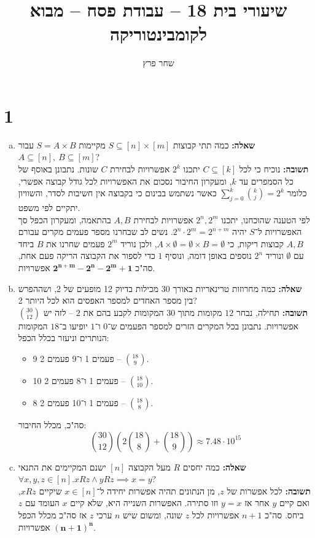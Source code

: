 \documentclass[]{article}
\title{שיעורי בית 18 -- עבודת פסח -- מבוא לקומבינטוריקה}
\author{שחר פרץ}
\begin{document}
	\maketitle
	\section*{1} %
	\begin{enumerate}[(a)]
		\item \textbf{שאלה: } כמה תתי קבוצות $S \subseteq [n] \times [m]$ מקיימות $S = A \times B$ עבור $A \subseteq [n], \ B \subseteq [m]$? \\
		\textbf{תשובה: }נוכיח כי לכל $C \subseteq [k]$ יתכנו $2^k$ אפשרויות לבחירת $C$ שונות. נתבונן באוסף של כל הסמפרים עד $k$, ומעקרון החיבור נסכום את האפשרויות לכל גודל קבוצה אפשרי, כלומר $\sum_{j = 0}^{k} \binom{k}{j} = 2^k$ כאשר נשתמש בבינום כי בקבוצה אין חשיבות לסדר, והשוויון יתקיים לפי משפט. \\
		לפי הטענה שהוכחנו, יתכנו $2^n, 2^m$ אפשרויות לבחירת $A, B$ בהתאמה, ומעקרון הכפל סך האפשרויות ל־$S$ יהיה
		$2^n \cdot 2^m = 2^{n + m}$. נשים לב שבחרנו מספר פעמים מקרים עבורם $A, B$ קבוצות ריקות, כי $A \times \emptyset = \emptyset \times B = \emptyset$, ולכן נוריד $2^m$ פעמים שחרנו את $B$ ביחד עם $\emptyset$ ונוריד $2^n$ נוספים באופן דומה, ונוסיף $1$ כדי לספור את הקבוצה הריקה פעם אחת, סה"כ $\bm{2^{n + m} - 2^n - 2^m + 1}$ אפשרויות. 
		\item \textbf{שאלה: }כמה מחרוזות טרינאריות באורך 30 מכילות בדיוק 12 מופעים של 2, ושההפרש בין מספר האחדים למספר האפסים הוא לכל היותר 2? \\
		\textbf{תשובה: }תחילה, נבחר $12$ מקומות מתוך $30$ המקומות לקבע בהם את $2$ – לזה יש $\binom{30}{12}$ אפשרויות. נתבונן בכל המקרים הזרים למספר הפעמים ש־$0$ ו־$1$ יופיעו ב־$18$ המקומות הנותרים וניעזר בכלל הכפל: 
		\begin{itemize}
			\item 9 פעמים 1 ו־9 פעמים 2 – $\binom{18}{9}$. 
			\item 10 פעמים 1 ו־8 פעמים 2 – $\binom{18}{10}$. 
			\item 8 פעמים 1 ו־10 פעמים 2 – $\binom{18}{8}$. 
		\end{itemize}
		סה"כ, מכלל החיבור: 
		\[ \binom{30}{12}\left (2\binom{18}{8} + \binom{18}{9}\right ) \approx 7.48 \cdot 10^{15} \]
		\item \textbf{שאלה: }כמה יחסים $R$ מעל הקבוצה $[n]$ ישנם המקיימים את התנאי $\forall x, y, z \in [n]. xRz \land yRz \implies x = y$? \\
		\textbf{תשובה: }לכל אפשרות של $z$, מן הנתונים תהיה אפשרות יחידה ל־$x \in [n]$ שיקיים $xRz$, ואם קיים $y$ אחר אז $y = x$ וזו סתירה. האפשרות השנייה היא, שלא קיים $x$ העומד עם $z$ ביחס. סה"כ $n + 1$ אפשרויות לכל $z$ שונה, ומשום שיש $n$ ערכי $z$ אז סה"כ מכלל הכפל $\bm{(n + 1)^n}$ אפשרויות. 
		
	\end{enumerate}
\end{document}
